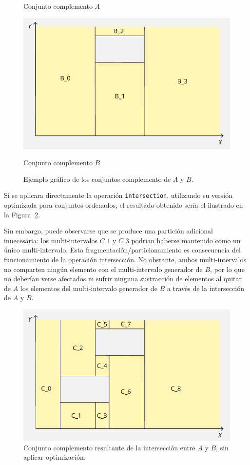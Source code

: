 \begin{figure}[htbp]
\begin{minipage}[t]{0.49\textwidth}
        \caption*{\small Conjunto complemento $A$}
        \vspace{8pt}
        \includegraphics[width=\linewidth]{figures/Optimazaciones/Complement/B.png}
        \caption*{\small Conjunto complemento $B$}
    \end{minipage}
    \caption{Ejemplo gráfico de los conjuntos complemento de $A$ y $B$.}
    \label{fig:tra}
\end{figure}

Si se aplicara directamente la operación \texttt{intersection}, utilizando su versión optimizada para conjuntos ordenados, el resultado obtenido sería el ilustrado en la Figura~\ref{fig:compleAnt}. 

Sin embargo, puede observarse que se produce una partición adicional innecesaria: los multi-intervalos $C\_1$ y $C\_3$ podrían haberse mantenido como un único multi-intervalo. Esta fragmentación/particionamiento es consecuencia del funcionamiento de la operación intersección. No obstante, ambos multi-intervalos no comparten ningún elemento con el multi-intervalo generador de $B$, por lo que no deberían verse afectados ni sufrir ninguna sustracción de elementos al quitar de $A$ los elementos del multi-intervalo generador de $B$ a través de la intersección de $A$ y $B$.


\begin{figure}[htbp]
    \centering
    \includegraphics[width=0.8\linewidth]{figures/Optimazaciones/Complement/complAnt.png}
    \caption{Conjunto complemento resultante de la intersección entre $A$ y $B$, sin aplicar optimización.}
    \label{fig:compleAnt}
\end{figure}

